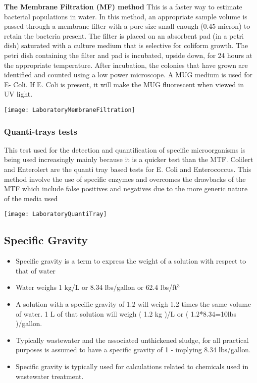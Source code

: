 \textbf{The Membrane Filtration (MF) method}
This is a faster way to estimate bacterial populations in water.  In this method, an appropriate sample volume is passed through a membrane filter with a pore size small enough (0.45 micron) to retain the bacteria present. The filter is placed on an absorbent pad (in a petri dish) saturated with a culture medium that is selective for coliform growth. The petri dish containing the filter and pad is incubated, upside down, for 24 hours at the appropriate temperature. After incubation, the colonies that have grown are identified and counted using a low power microscope. A MUG medium is used for E- Coli.  If E. Coli is present, it will make the MUG fluorescent when viewed in UV light. 
\begin{center}
\texttt{[image: LaboratoryMembraneFiltration]}
\end{center}
\pagebreak

\subsubsection{Quanti-trays tests}

This test used for the detection and quantification of specific microorganisms is being used increasingly mainly because it is a quicker test than the MTF.  Colilert and Enterolert are the quanti tray based tests for E. Coli and Enterococcus.  This method involve the use of specific enzymes and overcomes the drawbacks of the MTF which include false positives and negatives due to the more generic nature of the media used
\begin{center}
\texttt{[image: LaboratoryQuantiTray]}
\end{center}

\subsection{Specific Gravity}				
			\begin{itemize}
				\item Specific gravity is a term to express the weight of a solution with respect to that of water
				\item Water weighs 1 kg/L or 8.34 lbs/gallon or 62.4 lbs/ft$^3$
				\item A solution with a specific gravity of 1.2 will weigh 1.2 times the same volume of water.  1 L of that solution will weigh ( 1.2 kg )/L  or  ( 1.2*8.34=10lbs )/gallon.
				\item Typically wastewater and the associated unthickened sludge, for all practical purposes is assumed to have a specific gravity of 1 - implying 8.34 lbs/gallon.
				\item Specific gravity is typically used for calculations related to chemicals used in wastewater treatment.
			\end{itemize}


